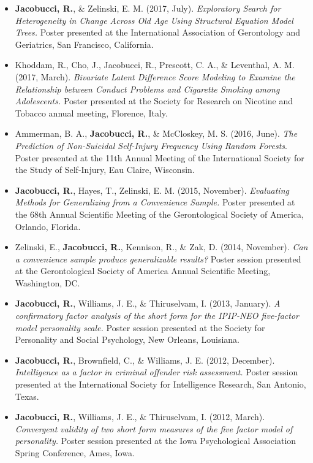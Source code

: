 \documentclass[letterpaper,10pt]{article}
\begin{document}
\begin{itemize}
\item[] \textbf{Jacobucci, R.}, \& Zelinski, E. M. (2017, July). \emph{Exploratory Search for Heterogeneity in Change Across Old Age Using Structural Equation Model Trees.} Poster presented at the International Association of Gerontology and Geriatrics, San Francisco, California.

\item[]Khoddam, R., Cho, J., Jacobucci, R., Prescott, C. A., \& Leventhal, A. M. (2017, March). \textit{Bivariate Latent Difference Score Modeling to Examine the Relationship between Conduct Problems and Cigarette Smoking among Adolescents.} Poster presented at the Society for Research on Nicotine and Tobacco annual meeting, Florence, Italy.    

\item[]Ammerman, B. A., \textbf{Jacobucci, R.}, \& McCloskey, M. S. (2016, June). \textit{The Prediction of Non-Suicidal Self-Injury Frequency Using Random Forests}. Poster presented at the 11th Annual Meeting of the International Society for the Study of Self-Injury, Eau Claire, Wisconsin.
%
\item[] \textbf{Jacobucci, R.}, Hayes, T., Zelinski, E. M. (2015, November). \emph{Evaluating Methods for Generalizing from a Convenience Sample.} Poster presented at the 68th Annual Scientific Meeting of the Gerontological Society of America, Orlando, Florida.
%
\item[]Zelinski, E., \textbf{Jacobucci, R.}, Kennison, R., \& Zak, D. (2014, November). \emph{Can a convenience sample produce generalizable results?} Poster session presented at the Gerontological Society of America Annual Scientific Meeting, Washington, DC.
%
\item[]\textbf{Jacobucci, R.}, Williams, J. E., \& Thiruselvam, I. (2013, January). \emph{A confirmatory factor analysis of the short form for the IPIP-NEO five-factor model personality scale.} Poster session presented at the Society for Personality and Social Psychology, New Orleans, Louisiana.
%
\item[]\textbf{Jacobucci, R.}, Brownfield, C., \& Williams, J. E. (2012, December). \emph{Intelligence as a factor in criminal offender risk assessment.} Poster session presented at the International Society for Intelligence Research, San Antonio, Texas.
%
\item []\textbf{Jacobucci, R.}, Williams, J. E., \& Thiruselvam, I. (2012, March). \emph{Convergent validity of two short form measures of the five factor model of personality.} Poster session presented at the Iowa Psychological Association Spring Conference, Ames, Iowa.
 
\end{itemize}
\end{document}
